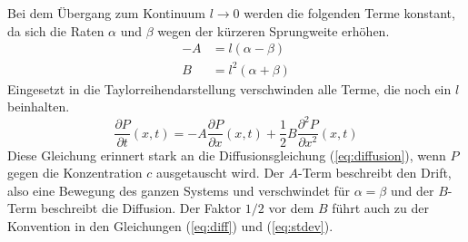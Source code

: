 Bei dem Übergang zum Kontinuum $l \to 0$ werden die folgenden Terme konstant, da sich die Raten $\alpha$ und $\beta$ wegen der kürzeren Sprungweite erhöhen.
\begin{align}
  - A & = l (\alpha - \beta) \\
  B & = l^2 (\alpha + \beta)
\end{align}
Eingesetzt in die Taylorreihendarstellung verschwinden alle Terme, die noch ein $l$ beinhalten.
\begin{equation}
  \frac{\partial P}{\partial t} (x, t) = - A \frac{\partial P}{\partial x}(x, t) + \frac{1}{2} B \frac{\partial^2 P}{\partial x^2} (x, t)
\end{equation}
Diese Gleichung erinnert stark an die Diffusionsgleichung (\ref{eq:diffusion}), wenn $P$ gegen die Konzentration $c$ ausgetauscht wird. Der $A$-Term beschreibt den Drift, also eine Bewegung des ganzen Systems und verschwindet für $\alpha = \beta$ und der $B$-Term beschreibt die Diffusion. Der Faktor $1/2$ vor dem $B$ führt auch zu der Konvention in den Gleichungen (\ref{eq:diff}) und (\ref{eq:stdev}).
